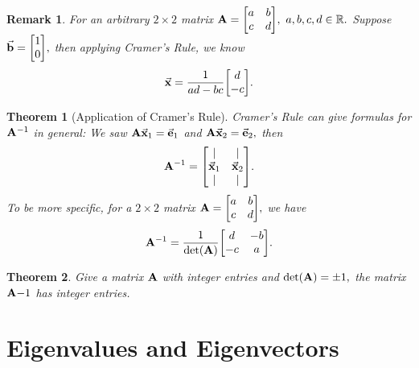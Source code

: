 \documentclass[12pt, a4paper]{article}
\newtheorem{thm}{Theorem}[subsection]
\newtheorem*{rmk}{\indent Remark}
\def\R{{\mathbb{R}}}
\def\vecx{\va{x}}
\def\vecb{\va{b}}
\def\vece{\va{e}}
\def\matrixA{\vb{A}}
\begin{document}
\begin{rmk}
	For an arbitrary $2\times2$ matrix $\matrixA=\mqty[a&b\\c&d],\ a,b,c,d\in\R.$ Suppose $\vecb=\mqty[1\\0],$ then applying Cramer's Rule, we know \[\vecx=\dfrac{1}{ad-bc}\mqty[d\\-c].\]
\end{rmk}
\begin{thm}[Application of Cramer's Rule]
	Cramer's Rule can give formulas for $\matrixA^{-1}$ in general: We saw $\matrixA\vecx_1=\vece_1$ and $\matrixA\vecx_2=\vece_2,$ then \[\matrixA^{-1}=\mqty[|&|\\\vecx_1&\vecx_2\\|&|].\]	To be more specific, for a $2\times2$ matrix $\matrixA=\mqty[a&b\\c&d],$ we have \[\matrixA^{-1}=\dfrac{1}{\det(\matrixA)}\mqty[d&-b\\-c&a].\]
\end{thm}
\begin{thm}
	Give a matrix $\matrixA$ with integer entries and $\det(\matrixA)=\pm1,$ the matrix $\matrixA{-1}$ has integer entries. 
\end{thm}


\newpage
\section{Eigenvalues and Eigenvectors}
\end{document}
